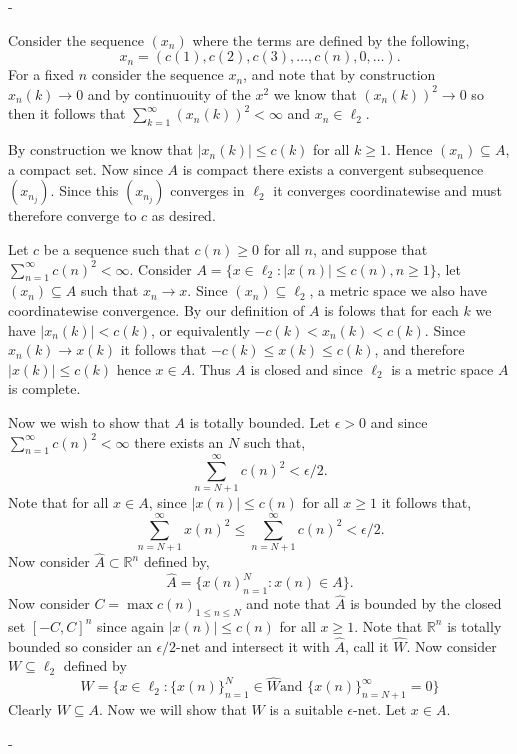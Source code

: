 \documentclass[12pt]{article}
\makeatletter
\theoremstyle{ex215}
\newcounter{probcount}
\newlength\probsep
\newlength\pshrinking
\newenvironment{problems}%
  {\ifhmode\unskip\par\fi\setcounter{probcount}{0}\probsep\parskip
  \sbox\@tempboxa{\textbf{9.}}\pshrinking\wd\@tempboxa\advance\pshrinking\labelsep
  \advance\linewidth -\pshrinking
  \advance\@totalleftmargin\pshrinking
  \advance\leftskip\pshrinking}%
  {\ifhmode\unskip \par\fi\advance\leftskip-\pshrinking}%
\renewenvironment{proof}[1][\proofname]{\par
  \pushQED{\qed}%
  \normalfont \topsep6\p@\@plus6\p@\relax
  \trivlist
  \@topsep \topsep
  \item[\hskip\labelsep
        \itshape
    #1\@addpunct{.}]\ignorespaces
}{%
  \popQED\endtrivlist\@endpefalse
}
\newcommand{\Reals}{\ensuremath{\mathbb R}}
\let\RR\Reals
\makeatother
\begin{document}
\begin{problems}
\begin{proof}
  Consider the sequence $(x_n)$ where the terms are defined by the following, 
  $$x_n = (c(1), c(2), c(3), \dots, c(n), 0, \dots).$$ For a fixed $n$ consider the sequence $x_n$, and note that by construction $x_n(k) \to 0$ and by continuouity of the $x^2$ 
  we know that $(x_n(k))^2 \to 0$ so then it follows that $\sum_{k = 1}^{\infty}(x_n(k))^2 < \infty$ and $x_n \in \ell_2$. 
  
  By construction we know that $|x_n(k)| \leq c(k)$ for all $k \geq 1$.
  Hence $(x_n) \subseteq A$, a compact set. Now since $A$ is compact there exists a convergent subsequence $(x_{n_j})$. Since this $(x_{n_j})$ converges in $\ell_2$ it converges coordinatewise and must therefore converge to $c$ as desired. 
\end{proof}


\begin{proof} Let $c$ be a sequence such that $c(n) \geq 0$ for all $n$, and suppose that 
  $\sum_{n = 1}^{\infty}c(n)^2 < \infty$. Consider $A = \{x\in \ell_2: |x(n)| \leq c(n), n \geq 1\}$, let $(x_n) \subseteq A$ such that $x_n \to x$. Since $(x_n) \subseteq \ell_2$, a metric space we also have coordinatewise convergence. By our definition of $A$ is folows that for each $k$ we have $|x_n(k)| < c(k)$, or equivalently  $-c(k)< x_n(k) < c(k)$. Since $x_n(k) \to x(k)$ it follows that $-c(k) \leq x(k) \leq c(k)$, and therefore $|x(k)| \leq c(k)$ hence $x \in A$. Thus $A$ is closed and since $\ell_2$ is a metric space $A$ is complete. 
  
  
  Now we wish to show that $A$ is totally bounded. Let $\epsilon > 0$ and since $\sum_{n = 1}^{\infty}c(n)^2 < \infty$ there exists an $N$ such that, 
  \begin{equation*}
    \sum_{n = N+1}^{\infty}c(n)^2  < \epsilon/2.
  \end{equation*}
  Note that for all $x \in A$, since $|x(n)| \leq c(n)$ for all $x \geq 1$ it follows that, 
  \begin{equation*}
    \sum_{n = N+1}^{\infty}x(n)^2 \leq \sum_{n = N+1}^{\infty}c(n)^2 < \epsilon/2.
  \end{equation*}
  Now consider $\hat{A} \subset \RR^n$ defined by, 
  \begin{equation*}
    \hat{A} = \{{x(n)}_{n = 1}^N: x(n) \in A\}. 
  \end{equation*}
  Now consider $C = \max{c(n)}_{1 \leq n \leq N}$ and note that $\hat{A}$ is bounded by the closed set $[-C, C]^n$ since again $|x(n)| \leq c(n)$ for all $x \geq 1$. Note that $\RR^n$ is totally bounded so consider an $\epsilon/2$-net and intersect it with $\hat{A}$, call it $\hat{W}$. Now consider $W \subseteq \ell_2$ defined by 
  \begin{equation*}
    W = \{x\in \ell_2: \{x(n)\}_{n = 1}^N \in \hat{W} \text{and } \{x(n)\}_{n = N+1}^\infty = 0 \}
  \end{equation*}
  Clearly $W \subseteq A$. Now we will show that $W$ is a suitable $\epsilon$-net. 
  Let $x \in A$. 
  

\end{proof}
\end{problems}
\end{document}
